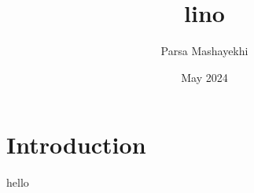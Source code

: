 \documentclass{article}
\title{lino}
\author{Parsa Mashayekhi}
\date{May 2024}
\begin{document}
\maketitle

\section{Introduction}
hello 
\end{document}
